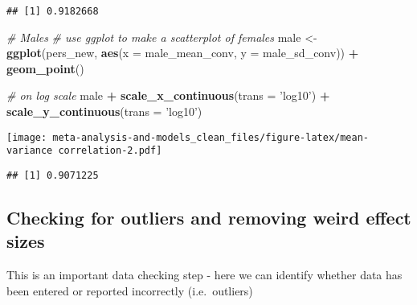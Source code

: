 \documentclass[]{article}
\newenvironment{Shaded}{\begin{snugshade}}{\end{snugshade}}
\newcommand{\KeywordTok}[1]{\textcolor[rgb]{0.13,0.29,0.53}{\textbf{#1}}}
\newcommand{\DataTypeTok}[1]{\textcolor[rgb]{0.13,0.29,0.53}{#1}}
\newcommand{\StringTok}[1]{\textcolor[rgb]{0.31,0.60,0.02}{#1}}
\newcommand{\CommentTok}[1]{\textcolor[rgb]{0.56,0.35,0.01}{\textit{#1}}}
\newcommand{\OperatorTok}[1]{\textcolor[rgb]{0.81,0.36,0.00}{\textbf{#1}}}
\newcommand{\NormalTok}[1]{#1}
\begin{document}
\begin{verbatim}
## [1] 0.9182668
\end{verbatim}

\begin{Shaded}
\begin{Highlighting}[]
  \CommentTok{# Males}
    \CommentTok{# use ggplot to make a scatterplot of females}
\NormalTok{    male <-}\StringTok{ }\KeywordTok{ggplot}\NormalTok{(pers_new, }\KeywordTok{aes}\NormalTok{(}\DataTypeTok{x =}\NormalTok{ male_mean_conv, }\DataTypeTok{y =}\NormalTok{ male_sd_conv)) }\OperatorTok{+}\StringTok{ }\KeywordTok{geom_point}\NormalTok{()}
    
    \CommentTok{# on log scale}
\NormalTok{    male }\OperatorTok{+}\StringTok{ }\KeywordTok{scale_x_continuous}\NormalTok{(}\DataTypeTok{trans =} \StringTok{'log10'}\NormalTok{) }\OperatorTok{+}\StringTok{ }\KeywordTok{scale_y_continuous}\NormalTok{(}\DataTypeTok{trans =} \StringTok{'log10'}\NormalTok{)}
\end{Highlighting}
\end{Shaded}

\texttt{[image: meta-analysis-and-models\_clean\_files/figure-latex/mean-variance correlation-2.pdf]}

\begin{Shaded}
\end{Shaded}

\begin{verbatim}
## [1] 0.9071225
\end{verbatim}

\subsection{Checking for outliers and removing weird effect
sizes}\label{checking-for-outliers-and-removing-weird-effect-sizes}

This is an important data checking step - here we can identify whether
data has been entered or reported incorrectly (i.e.~outliers)
\end{document}
